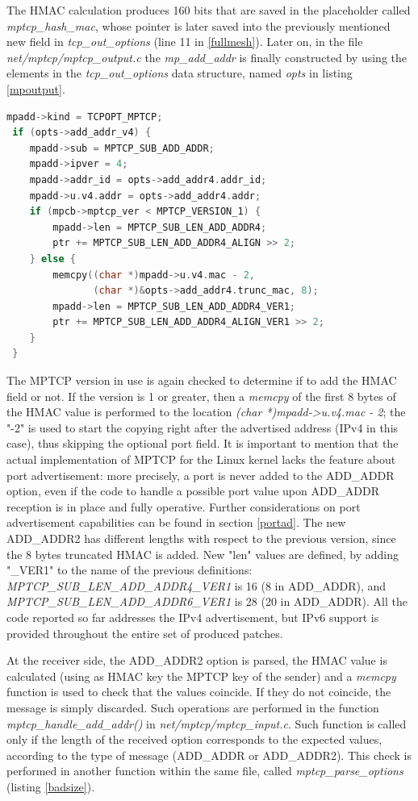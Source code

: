 The HMAC calculation produces 160 bits that are saved in the placeholder called \textit{mptcp\_hash\_mac}, whose pointer is later saved into the previously mentioned new field in \textit{tcp\_out\_options} (line 11 in \ref{fullmesh}).
Later on, in the file \textit{net/mptcp/mptcp\_output.c} the \textit{mp\_add\_addr} is finally constructed by using the elements in the \textit{tcp\_out\_options} data structure, named \textit{opts} in listing \ref{mpoutput}.

\begin{lstlisting}[language=c, caption=\textit{Building ADD\_ADDR2 output message}, label=mpoutput]
 mpadd->kind = TCPOPT_MPTCP;
 if (opts->add_addr_v4) {
 	mpadd->sub = MPTCP_SUB_ADD_ADDR;
 	mpadd->ipver = 4;
 	mpadd->addr_id = opts->add_addr4.addr_id;
 	mpadd->u.v4.addr = opts->add_addr4.addr;
 	if (mpcb->mptcp_ver < MPTCP_VERSION_1) {
 		mpadd->len = MPTCP_SUB_LEN_ADD_ADDR4;
 		ptr += MPTCP_SUB_LEN_ADD_ADDR4_ALIGN >> 2;
 	} else {
 		memcpy((char *)mpadd->u.v4.mac - 2,
 		       (char *)&opts->add_addr4.trunc_mac, 8);
 		mpadd->len = MPTCP_SUB_LEN_ADD_ADDR4_VER1;
 		ptr += MPTCP_SUB_LEN_ADD_ADDR4_ALIGN_VER1 >> 2;
 	}
 }
\end{lstlisting}

The MPTCP version in use is again checked to determine if to add the HMAC field or not. If the version is 1 or greater, then a \textit{memcpy} of the first 8 bytes of the HMAC value is performed to the location \textit{(char *)mpadd->u.v4.mac - 2}; the "-2" is used to start the copying right after the advertised address (IPv4 in this case), thus skipping the optional port field. It is important to mention that the actual implementation of MPTCP for the Linux kernel lacks the feature about port advertisement: more precisely, a port is never added to the ADD\_ADDR option, even if the code to handle a possible port value upon ADD\_ADDR reception is in place and fully operative. Further considerations on port advertisement capabilities can be found in section \ref{portad}. The new ADD\_ADDR2 has different lengths with respect to the previous version, since the 8 bytes truncated HMAC is added. New "len" values are defined, by adding "\_VER1" to the name of the previous definitions: \textit{MPTCP\_SUB\_LEN\_ADD\_ADDR4\_VER1} is 16 (8 in ADD\_ADDR), and \textit{MPTCP\_SUB\_LEN\_ADD\_ADDR6\_VER1} is 28 (20 in ADD\_ADDR). All the code reported so far addresses the IPv4 advertisement, but IPv6 support is provided throughout the entire set of produced patches.


At the receiver side, the ADD\_ADDR2 option is parsed, the HMAC value is calculated (using as HMAC key the MPTCP key of the sender) and a \textit{memcpy} function is used to check that the values coincide. If they do not coincide, the message is simply discarded. Such operations are performed in the function \textit{mptcp\_handle\_add\_addr()} in \textit{net/mptcp/mptcp\_input.c}. Such function is called only if the length of the received option corresponds to the expected values, according to the type of message (ADD\_ADDR or ADD\_ADDR2). This check is performed in another function within the same file, called \textit{mptcp\_parse\_options} (listing \ref{badsize}).

